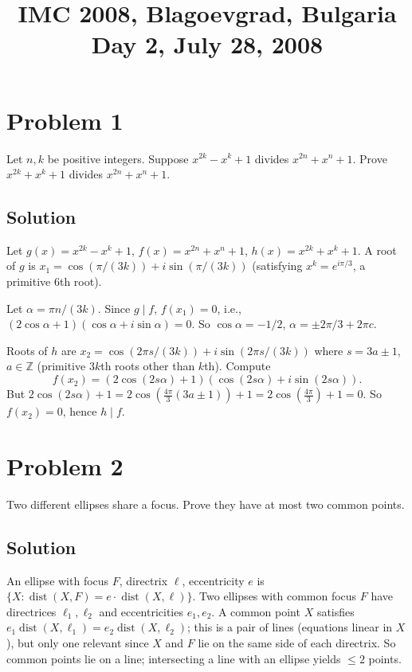 \documentclass{article}
\title{IMC 2008, Blagoevgrad, Bulgaria \\ Day 2, July 28, 2008}
\date{}
\begin{document}
\maketitle

\section*{Problem 1}
Let $n, k$ be positive integers. Suppose $x^{2k} - x^k + 1$ divides $x^{2n} + x^n + 1$. Prove $x^{2k} + x^k + 1$ divides $x^{2n} + x^n + 1$.

\subsection*{Solution}
Let $g(x) = x^{2k} - x^k + 1$, $f(x) = x^{2n} + x^n + 1$, $h(x) = x^{2k} + x^k + 1$. A root of $g$ is $x_1 = \cos(\pi/(3k)) + i \sin(\pi/(3k))$ (satisfying $x^k = e^{i\pi/3}$, a primitive 6th root).

Let $\alpha = \pi n/(3k)$. Since $g \mid f$, $f(x_1) = 0$, i.e., $(2 \cos \alpha + 1)(\cos \alpha + i \sin \alpha) = 0$. So $\cos \alpha = -1/2$, $\alpha = \pm 2\pi/3 + 2\pi c$.

Roots of $h$ are $x_2 = \cos(2\pi s/(3k)) + i \sin(2\pi s/(3k))$ where $s = 3a \pm 1$, $a \in \mathbb{Z}$ (primitive $3k$th roots other than $k$th). Compute
\[
f(x_2) = (2\cos(2s\alpha) + 1)(\cos(2s\alpha) + i \sin(2s\alpha)).
\]
But $2 \cos(2 s \alpha) + 1 = 2 \cos(\tfrac{4\pi}{3}(3a \pm 1)) + 1 = 2 \cos(\tfrac{4\pi}{3}) + 1 = 0$. So $f(x_2) = 0$, hence $h \mid f$.

\section*{Problem 2}
Two different ellipses share a focus. Prove they have at most two common points.

\subsection*{Solution}
An ellipse with focus $F$, directrix $\ell$, eccentricity $e$ is $\{X : \operatorname{dist}(X, F) = e \cdot \operatorname{dist}(X, \ell)\}$. Two ellipses with common focus $F$ have directrices $\ell_1, \ell_2$ and eccentricities $e_1, e_2$. A common point $X$ satisfies $e_1 \operatorname{dist}(X, \ell_1) = e_2 \operatorname{dist}(X, \ell_2)$; this is a pair of lines (equations linear in $X$), but only one relevant since $X$ and $F$ lie on the same side of each directrix. So common points lie on a line; intersecting a line with an ellipse yields $\le 2$ points.
\end{document}
